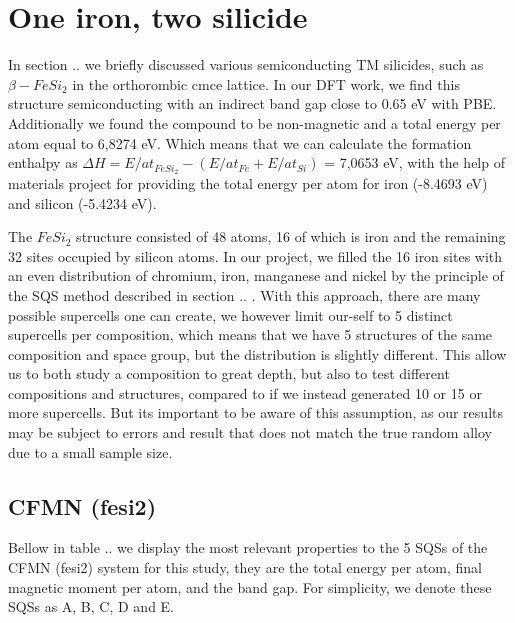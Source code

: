 \section{One iron, two silicide}
In section .. we briefly discussed various semiconducting TM silicides, such as $\beta-FeSi_2$ in the orthorombic cmce lattice. In our DFT work, we find this structure semiconducting with an indirect band gap close to 0.65 eV with PBE. Additionally we found the compound to be non-magnetic and a total energy per atom equal to 6,8274 eV. Which means that we can calculate the formation enthalpy as $\Delta H = E/at_{FeSi_2} - (E/at_{Fe} + E/at_{Si})$ = 7,0653 eV, with the help of materials project for providing the total energy per atom for iron (-8.4693 eV) and silicon (-5.4234 eV).

The $FeSi_2$ structure consisted of 48 atoms, 16 of which is iron and the remaining 32 sites occupied by silicon atoms. In our project, we filled the 16 iron sites with an even distribution of chromium, iron, manganese and nickel by the principle of the SQS method described in section .. . With this approach, there are many possible supercells one can create, we however limit our-self to 5 distinct supercells per composition, which means that we have 5 structures of the same composition and space group, but the distribution is slightly different. This allow us to both study a composition to great depth, but also to test different compositions and structures, compared to if we instead generated 10 or 15 or more supercells. But its important to be aware of this assumption, as our results may be subject to errors and result that does not match the true random alloy due to a small sample size.

\subsection{CFMN (fesi2)} 

Bellow in table .. we display the most relevant properties to the 5 SQSs of the CFMN (fesi2) system for this study, they are the total energy per atom, final magnetic moment per atom, and the band gap. For simplicity, we denote these SQSs as A, B, C, D and E.   

